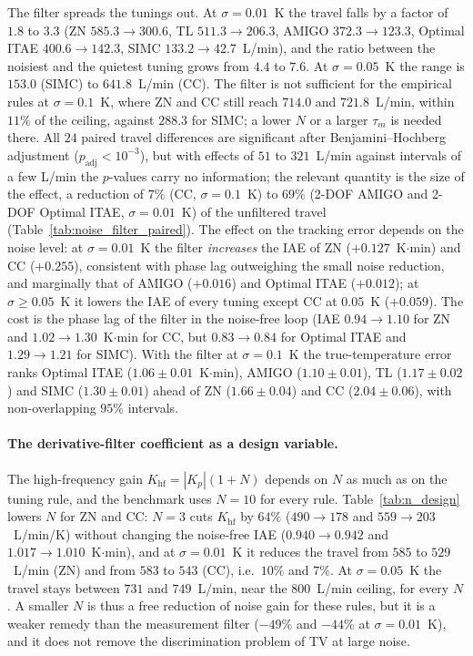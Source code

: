 \documentclass[11pt]{article}
\begin{document}
The filter spreads the tunings out. At $\sigma = 0.01$~K the travel falls by a factor of $1.8$ to $3.3$ (ZN $585.3 \rightarrow 300.6$, TL $511.3 \rightarrow 206.3$, AMIGO $372.3 \rightarrow 123.3$, Optimal ITAE $400.6 \rightarrow 142.3$, SIMC $133.2 \rightarrow 42.7$~L/min), and the ratio between the noisiest and the quietest tuning grows from $4.4$ to $7.6$. At $\sigma = 0.05$~K the range is $153.0$ (SIMC) to $641.8$~L/min (CC). The filter is not sufficient for the empirical rules at $\sigma = 0.1$~K, where ZN and CC still reach $714.0$ and $721.8$~L/min, within $11\%$ of the ceiling, against $288.3$ for SIMC; a lower $N$ or a larger $\tau_m$ is needed there. All $24$ paired travel differences are significant after Benjamini--Hochberg adjustment ($p_{\mathrm{adj}} < 10^{-3}$), but with effects of $51$ to $321$~L/min against intervals of a few L/min the $p$-values carry no information; the relevant quantity is the size of the effect, a reduction of $7\%$ (CC, $\sigma = 0.1$~K) to $69\%$ (2-DOF AMIGO and 2-DOF Optimal ITAE, $\sigma = 0.01$~K) of the unfiltered travel (Table~\ref{tab:noise_filter_paired}). The effect on the tracking error depends on the noise level: at $\sigma = 0.01$~K the filter \emph{increases} the IAE of ZN ($+0.127$~K$\cdot$min) and CC ($+0.255$), consistent with phase lag outweighing the small noise reduction, and marginally that of AMIGO ($+0.016$) and Optimal ITAE ($+0.012$); at $\sigma \ge 0.05$~K it lowers the IAE of every tuning except CC at $0.05$~K ($+0.059$). The cost is the phase lag of the filter in the noise-free loop (IAE $0.94 \rightarrow 1.10$ for ZN and $1.02 \rightarrow 1.30$~K$\cdot$min for CC, but $0.83 \rightarrow 0.84$ for Optimal ITAE and $1.29 \rightarrow 1.21$ for SIMC). With the filter at $\sigma = 0.1$~K the true-temperature error ranks Optimal ITAE ($1.06 \pm 0.01$~K$\cdot$min), AMIGO ($1.10 \pm 0.01$), TL ($1.17 \pm 0.02$) and SIMC ($1.30 \pm 0.01$) ahead of ZN ($1.66 \pm 0.04$) and CC ($2.04 \pm 0.06$), with non-overlapping $95\%$ intervals.

\paragraph{The derivative-filter coefficient as a design variable.} The high-frequency gain $K_{\mathrm{hf}} = |K_p|(1+N)$ depends on $N$ as much as on the tuning rule, and the benchmark uses $N = 10$ for every rule. Table~\ref{tab:n_design} lowers $N$ for ZN and CC: $N = 3$ cuts $K_{\mathrm{hf}}$ by $64\%$ ($490 \rightarrow 178$ and $559 \rightarrow 203$~L/min/K) without changing the noise-free IAE ($0.940 \rightarrow 0.942$ and $1.017 \rightarrow 1.010$~K$\cdot$min), and at $\sigma = 0.01$~K it reduces the travel from $585$ to $529$~L/min (ZN) and from $583$ to $543$ (CC), i.e.\ $10\%$ and $7\%$. At $\sigma = 0.05$~K the travel stays between $731$ and $749$~L/min, near the $800$~L/min ceiling, for every $N$. A smaller $N$ is thus a free reduction of noise gain for these rules, but it is a weaker remedy than the measurement filter ($-49\%$ and $-44\%$ at $\sigma = 0.01$~K), and it does not remove the discrimination problem of TV at large noise.
\end{document}
